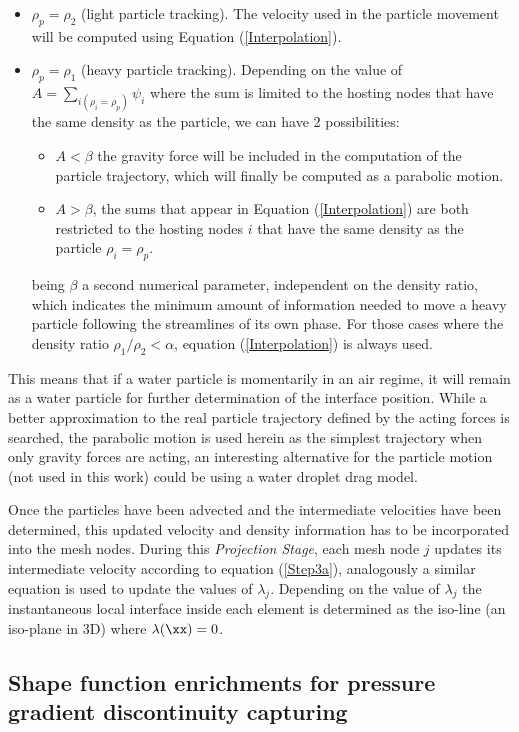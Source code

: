  \begin{itemize}
    \item $\rho_p=\rho_2$ (light particle tracking). The velocity used in the particle movement will be computed using Equation (\ref{Interpolation}).
    \item $\rho_p=\rho_1$ (heavy particle tracking). Depending on the value of $A=\sum_{i(\rho_i=\rho_p)}\psi_i$ where the sum is limited to the hosting nodes that have the same density as the particle, we can have 2 possibilities:
    \begin{itemize}
      \item $A<\beta$  the gravity force will be included in the computation of the particle trajectory, which will finally be computed as a parabolic motion.
      \item $A>\beta$, the sums that appear in Equation (\ref{Interpolation}) are both restricted to the hosting nodes $i$ that have the same density as the particle $\rho_i=\rho_p$.
    \end{itemize}
    being $\beta$ a second numerical parameter, independent on the density ratio, which indicates the minimum amount of information needed to move a heavy particle following the streamlines of its own phase. For those cases where the density ratio $\rho_1/\rho_2<\alpha$, equation (\ref{Interpolation}) is always used.
 \end{itemize}

This means that if a water particle is momentarily in an air regime, it will remain as a water particle for further determination of the interface position. While a better approximation to the real particle trajectory defined by the acting forces is searched, the parabolic motion is used herein as the simplest trajectory when only gravity forces are acting, an interesting alternative for the particle motion (not used in this work) could be using a water droplet drag model.

Once the particles have been advected and the intermediate velocities have been determined, this updated velocity and density information has to be incorporated into the mesh nodes. During this \textit{Projection Stage}, each mesh node $j$ updates its intermediate velocity according to equation (\ref{Step3a}), analogously a similar equation is used to update the values of $\lambda_j$. Depending on the value of $\lambda_j$ the instantaneous local interface inside each element is determined as the iso-line (an iso-plane in 3D) where $\lambda(\xx)=0$.

\subsection[Enriched Shape Functions]{Shape function enrichments for pressure gradient discontinuity capturing}

